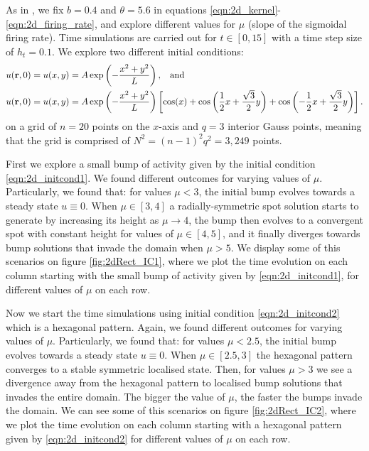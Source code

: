 \documentclass{uonmathreport}
\begin{document}
As in \cite{rankin2014continuation}, we fix $b=0.4$ and $\theta=5.6$ in equations \ref{eqn:2d_kernel}-\ref{eqn:2d_firing_rate}, and explore different values for $\mu$ (slope of the sigmoidal firing rate). Time simulations are carried out for $t \in [0,15]$ with a time step size of $h_t = 0.1$. We explore two different initial conditions:
\begin{subequations}
	\begin{align}
		u(\mathbf{r},0) = u(x,y) &= A \exp \left(-\frac{x^2+y^2}{L}\right), \hspace{3mm} \textnormal{and} \label{eqn:2d_initcond1}\\
		u(\mathbf{r},0) = u(x,y) &= A \exp \left(-\frac{x^2+y^2}{L}\right) \left[ \cos(x) + \cos\left( \frac{1}{2}x + \frac{\sqrt{3}}{2}y\right) + \cos\left( -\frac{1}{2}x + \frac{\sqrt{3}}{2}y\right)\right].\label{eqn:2d_initcond2}
	\end{align}
\end{subequations}
on a grid of $n=20$ points on the $x$-axis and $q=3$ interior Gauss points, meaning that the grid is comprised of $N^2 = (n-1)^2q^2 = 3,249$ points.

First we explore a small bump of activity given by the initial condition \ref{eqn:2d_initcond1}. We found different outcomes for varying values of $\mu$. Particularly, we found that: for values $\mu < 3$, the initial bump evolves towards a steady state $u \equiv 0$. When $\mu \in [3,4]$ a radially-symmetric spot solution starts to generate by increasing its height as $\mu \rightarrow 4$, the bump then evolves to a convergent spot with constant height for values of $\mu \in [4,5]$, and it finally diverges towards bump solutions that invade the domain when $\mu > 5$. We display some of this scenarios on figure \ref{fig:2dRect_IC1}, where we plot the time evolution on each column starting with the small bump of activity given by  \ref{eqn:2d_initcond1}, for different values of $\mu$ on each row.

Now we start the time simulations using initial condition \ref{eqn:2d_initcond2} which is a hexagonal pattern. Again, we found different outcomes for varying values of $\mu$. Particularly, we found that: for values $\mu < 2.5$, the initial bump evolves towards a steady state $u \equiv 0$. When $\mu \in [2.5,3]$ the hexagonal pattern converges to a stable symmetric localised state. Then, for values $\mu > 3$ we see a divergence away from the hexagonal pattern to localised bump solutions that invades the entire domain. The bigger the value of $\mu$, the faster the bumps invade the domain. We can see some of this scenarios on figure \ref{fig:2dRect_IC2}, where we plot the time evolution on each column starting with a hexagonal pattern given by  \ref{eqn:2d_initcond2} for different values of $\mu$ on each row.{\tiny }
\end{document}
